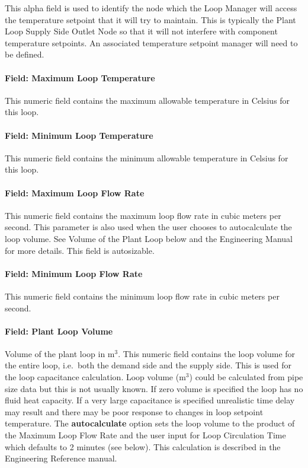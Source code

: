 This alpha field is used to identify the node which the Loop Manager will access the temperature setpoint that it will try to maintain. This is typically the Plant Loop Supply Side Outlet Node so that it will not interfere with component temperature setpoints. An associated temperature setpoint manager will need to be defined.

\paragraph{Field: Maximum Loop Temperature}\label{field-maximum-loop-temperature}

This numeric field contains the maximum allowable temperature in Celsius for this loop.

\paragraph{Field: Minimum Loop Temperature}\label{field-minimum-loop-temperature}

This numeric field contains the minimum allowable temperature in Celsius for this loop.

\paragraph{Field: Maximum Loop Flow Rate}\label{field-maximum-loop-flow-rate}

This numeric field contains the maximum loop flow rate in cubic meters per second. This parameter is also used when the user chooses to autocalculate the loop volume. See Volume of the Plant Loop below and the Engineering Manual for more details. This field is autosizable.

\paragraph{Field: Minimum Loop Flow Rate}\label{field-minimum-loop-flow-rate}

This numeric field contains the minimum loop flow rate in cubic meters per second.

\paragraph{Field: Plant Loop Volume}\label{field-plant-loop-volume}

Volume of the plant loop in m\(^{3}\). This numeric field contains the loop volume for the entire loop, i.e.~both the demand side and the supply side. This is used for the loop capacitance calculation. Loop volume (m\(^{3}\)) could be calculated from pipe size data but this is not usually known. If zero volume is specified the loop has no fluid heat capacity. If a very large capacitance is specified unrealistic time delay may result and there may be poor response to changes in loop setpoint temperature. The \textbf{autocalculate} option sets the loop volume to the product of the Maximum Loop Flow Rate and the user input for Loop Circulation Time which defaults to 2 minutes (see below). This calculation is described in the Engineering Reference manual.

